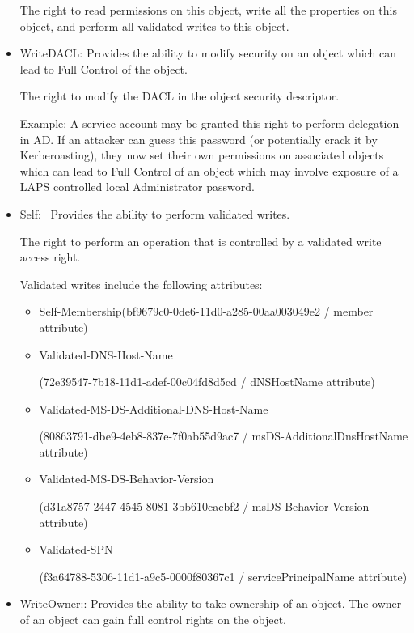 \begin{itemize}
The right to read permissions on this object, write all the properties on this object, and perform all validated writes to this object.
    \item WriteDACL: Provides the ability to modify security on an object which can lead to Full Control of the object.

The right to modify the DACL in the object security descriptor.

Example: A service account may be granted this right to perform delegation in AD. If an attacker can guess this password (or potentially crack it by Kerberoasting), they now set their own permissions on associated objects which can lead to Full Control of an object which may involve exposure of a LAPS controlled local Administrator password.
    \item Self:  Provides the ability to perform validated writes.

The right to perform an operation that is controlled by a validated write access right.

Validated writes include the following attributes:
    \begin{itemize}
        \item Self-Membership(bf9679c0-0de6-11d0-a285-00aa003049e2 / member attribute)
        \item Validated-DNS-Host-Name

(72e39547-7b18-11d1-adef-00c04fd8d5cd / dNSHostName attribute)
        \item Validated-MS-DS-Additional-DNS-Host-Name

(80863791-dbe9-4eb8-837e-7f0ab55d9ac7 / msDS-AdditionalDnsHostName attribute)
        \item Validated-MS-DS-Behavior-Version

(d31a8757-2447-4545-8081-3bb610cacbf2 / msDS-Behavior-Version attribute)
        \item Validated-SPN

(f3a64788-5306-11d1-a9c5-0000f80367c1 / servicePrincipalName attribute)
    \end{itemize}
    \item WriteOwner:: Provides the ability to take ownership of an object. The owner of an object can gain full control rights on the object.


\end{itemize}
